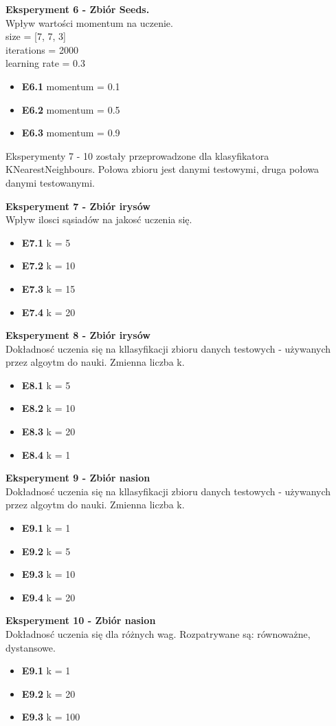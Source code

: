 \documentclass{classrep}
\begin{document}
\textbf{Eksperyment 6 - Zbiór Seeds.}\\
		Wpływ wartości momentum na uczenie.\\
		size = [7, 7, 3]\\
		iterations = 2000\\
		learning rate = 0.3
		\begin{itemize}
			\item \textbf{E6.1}
			 momentum = 0.1
			\item \textbf{E6.2} 
			momentum = 0.5
			\item \textbf{E6.3}
			momentum = 0.9\\
		\end{itemize}

Eksperymenty 7 - 10 zostały przeprowadzone dla klasyfikatora KNearestNeighbours. Połowa zbioru jest danymi testowymi, druga połowa danymi testowanymi.

\textbf{Eksperyment 7 - Zbiór irysów}\\
		Wpływ ilosci sąsiadów na jakosć uczenia się.
		\begin{itemize}
			\item \textbf{E7.1}
			 k = 5
			\item \textbf{E7.2} 
			k = 10
			\item \textbf{E7.3}
			k = 15
			\item \textbf{E7.4}
			k = 20\\
		\end{itemize}

	\textbf{Eksperyment 8 - Zbiór irysów}\\
		Dokładnosć uczenia się na kllasyfikacji zbioru danych testowych - używanych przez algoytm do nauki. Zmienna liczba k.
		\begin{itemize}
			\item \textbf{E8.1}
			 k = 5
			\item \textbf{E8.2} 
			k = 10
			\item \textbf{E8.3}
			k = 20
			\item \textbf{E8.4}
			k = 1
		\end{itemize}

	\textbf{Eksperyment 9 - Zbiór nasion}\\	
		Dokładnosć uczenia się na kllasyfikacji zbioru danych testowych - używanych przez algoytm do nauki. Zmienna liczba k.
		\begin{itemize}
			\item \textbf{E9.1}
			 k = 1
			\item \textbf{E9.2} 
			k = 5
			\item \textbf{E9.3}
			k = 10
			\item \textbf{E9.4}
			k = 20
		\end{itemize}
	\textbf{Eksperyment 10 - Zbiór nasion}\\	
		Dokładnosć uczenia się dla różnych wag. Rozpatrywane są: równoważne, dystansowe.
		\begin{itemize}
			\item \textbf{E9.1}
			k = 1
			\item \textbf{E9.2} 
			k = 20
			\item \textbf{E9.3} 
			k = 100
		\end{itemize}
\end{document}
